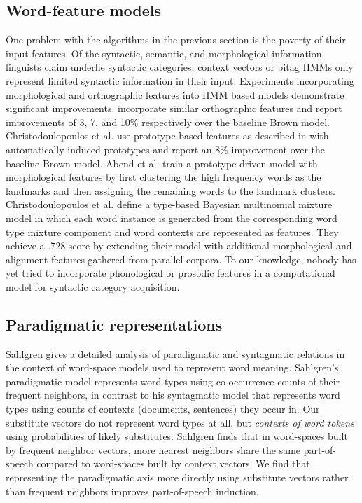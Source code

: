 \subsection{Word-feature models}
One problem with the algorithms in the previous section is the poverty
of their input features.  Of the syntactic, semantic, and
morphological information linguists claim underlie syntactic
categories, context vectors or bitag HMMs only represent limited
syntactic information in their input.  Experiments incorporating
morphological and orthographic features into HMM based models
demonstrate significant improvements.
\cite{Clark:2003:CDM:1067807.1067817,bergkirkpatrick-klein:2010:ACL,blunsom-cohn:2011:ACL-HLT2011}
incorporate similar orthographic features and report improvements of
3, 7, and 10\% respectively over the baseline Brown model.
Christodoulopoulos et
al.  use
prototype based features as described in
\cite{Haghighi:2006:PLS:1220835.1220876} with automatically induced
prototypes and report an 8\% improvement over the baseline Brown
model.  Abend et al.  train
a prototype-driven model with morphological features by first
clustering the high frequency words as the landmarks and then
assigning the remaining words to the landmark clusters.
Christodoulopoulos et
al. 
define a type-based Bayesian multinomial mixture model in which each
word instance is generated from the corresponding word type mixture
component and word contexts are represented as features.  They achieve
a .728 \mto score by extending their model with additional
morphological and alignment features gathered from parallel corpora.
To our knowledge, nobody has yet tried to incorporate phonological or
prosodic features in a computational model for syntactic category
acquisition.

\subsection{Paradigmatic representations}

Sahlgren  gives a detailed analysis of
paradigmatic and syntagmatic relations in the context of word-space
models used to represent word meaning.  Sahlgren's paradigmatic model
represents word types using co-occurrence counts of their frequent
neighbors, in contrast to his syntagmatic model that represents word
types using counts of contexts (documents, sentences) they occur in.
Our substitute vectors do not represent word types at all, but {\em
  contexts of word tokens} using probabilities of likely substitutes.
Sahlgren finds that in word-spaces built by frequent neighbor vectors,
more nearest neighbors share the same part-of-speech compared to
word-spaces built by context vectors.  We find that representing the
paradigmatic axis more directly using substitute vectors rather than
frequent neighbors improves part-of-speech induction.

